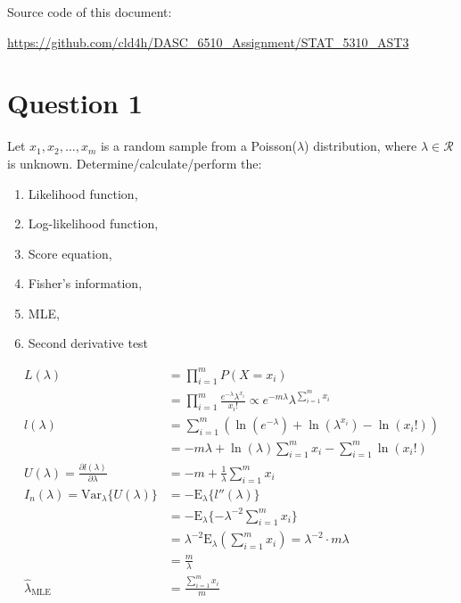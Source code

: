 \documentclass[11pt]{article}
\newcommand{\handout}[5]{
   \renewcommand{\thepage}{#1-\arabic{page}}
   \noindent
   \begin{center}
   \framebox{
      \vbox{
    \hbox to 5.78in { {\bf STAT 5310} \hfill #2 }
       \vspace{4mm}
       \hbox to 5.78in { {\Large \hfill #5  \hfill} }
       \vspace{2mm}
       \hbox to 5.78in { {\it #3 \hfill #4} }
      }
   }
   \end{center}
   \vspace*{4mm}
}
\newcommand{\ho}[5]{\handout{#1}{#2}{Instructor:
#3}{Scribe: #4}{Assignment #1: #5}}
\newcommand{\prob}[1]{
\begin{tcolorbox}[colback=green!5!white,colframe=green!75!black]
#1
\end{tcolorbox}
}
\begin{document}
Source code of this document:

\url{https://github.com/cld4h/DASC_6510_Assignment/STAT_5310_AST3}

\section{Question 1}
\prob{
Let $x_1, x_2, \ldots, x_m$ is a random sample from a Poisson($\lambda$) distribution, where $\lambda \in \mathcal{R}$ is unknown. Determine/calculate/perform the:
\begin{multicols}{2}
\begin{enumerate}
\item Likelihood function, \item Log-likelihood function, \item Score equation, \item Fisher’s information, \item MLE, \item Second derivative test
\end{enumerate}
\end{multicols}
}

\begin{align*}
L(\lambda)
&= \prod_{i=1}^m P(X=x_i)\\
&= \prod_{i=1}^m \frac{e^{-\lambda}\lambda^{x_i}}{x_i!} \propto e^{-m\lambda} \lambda^{\sum_{i=1}^{m} x_i}\\
l(\lambda)
&= \sum_{i=1}^{m} \left( \ln\left( e^{-\lambda} \right) +\ln\left(  \lambda^{x_i} \right) - \ln\left( x_{i}! \right) \right) \\
&=  -m\lambda + \ln(\lambda)\sum_{i=1}^{m} x_{i} - \sum_{i=1}^{m}\ln\left( x_{i}! \right)\\
U(\lambda)=\frac{\partial l(\lambda)}{\partial \lambda}
&=-m+\frac{1}{\lambda}\sum_{i=1}^{m} x_{i}\\
I_n(\lambda) = \text{Var}_{\lambda}\{U(\lambda)\} 
&= -\text{E}_{\lambda}\{l''\left( \lambda \right) \} \\
&= -\text{E}_{\lambda}\{-\lambda^{-2}\sum_{i=1}^{m} x_{i}\}\\
&=\lambda^{-2} \text{E}_{\lambda}\left( \sum_{i=1}^{m} x_i \right) =\lambda^{-2}\cdot m \lambda\\
&= \frac{m}{\lambda}\\
\hat{\lambda}_\text{MLE} &= \frac{\sum_{i=1}^{m} x_{i}}{m}\\
\end{align*}
\end{document}
